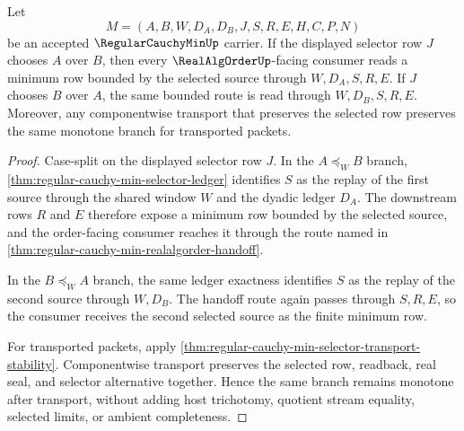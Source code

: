 \begin{theorem}
\label{thm:regular-cauchy-min-selector-monotonicity}
Let
$$
M=(A,B,W,D_A,D_B,J,S,R,E,H,C,P,N)
$$
be an accepted $\RegularCauchyMinUp$ carrier. If the displayed selector row $J$ chooses $A$ over $B$, then every $\RealAlgOrderUp$-facing consumer reads a minimum row bounded by the selected source through $W,D_A,S,R,E$. If $J$ chooses $B$ over $A$, the same bounded route is read through $W,D_B,S,R,E$. Moreover, any componentwise transport that preserves the selected row preserves the same monotone branch for transported packets.
\end{theorem}
\begin{proof}
Case-split on the displayed selector row $J$. In the $A \preceq_W B$ branch, \autoref{thm:regular-cauchy-min-selector-ledger} identifies $S$ as the replay of the first source through the shared window $W$ and the dyadic ledger $D_A$. The downstream rows $R$ and $E$ therefore expose a minimum row bounded by the selected source, and the order-facing consumer reaches it through the route named in \autoref{thm:regular-cauchy-min-realalgorder-handoff}.

In the $B \preceq_W A$ branch, the same ledger exactness identifies $S$ as the replay of the second source through $W,D_B$. The handoff route again passes through $S,R,E$, so the consumer receives the second selected source as the finite minimum row.

For transported packets, apply \autoref{thm:regular-cauchy-min-selector-transport-stability}. Componentwise transport preserves the selected row, readback, real seal, and selector alternative together. Hence the same branch remains monotone after transport, without adding host trichotomy, quotient stream equality, selected limits, or ambient completeness.
\end{proof}

